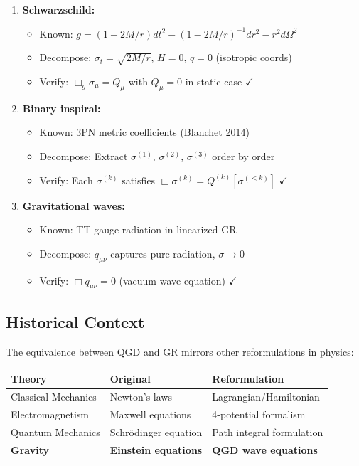 \documentclass[11pt,a4paper]{article}
\theoremstyle{definition}
\theoremstyle{remark}
\begin{document}
	\begin{enumerate}
		\item \textbf{Schwarzschild:}
		\begin{itemize}
			\item Known: $g = (1-2M/r)dt^2 - (1-2M/r)^{-1}dr^2 - r^2d\Omega^2$
			\item Decompose: $\sigma_t = \sqrt{2M/r}$, $H=0$, $q=0$ (isotropic coords)
			\item Verify: $\Box_g\sigma_\mu = Q_\mu$ with $Q_\mu = 0$ in static case $\checkmark$
		\end{itemize}
		
		\item \textbf{Binary inspiral:}
		\begin{itemize}
			\item Known: 3PN metric coefficients (Blanchet 2014)
			\item Decompose: Extract $\sigma^{(1)}$, $\sigma^{(2)}$, $\sigma^{(3)}$ order by order
			\item Verify: Each $\sigma^{(k)}$ satisfies $\Box\sigma^{(k)} = Q^{(k)}[\sigma^{(<k)}]$ $\checkmark$
		\end{itemize}
		
		\item \textbf{Gravitational waves:}
		\begin{itemize}
			\item Known: TT gauge radiation in linearized GR
			\item Decompose: $q_{\mu\nu}$ captures pure radiation, $\sigma \to 0$
			\item Verify: $\Box q_{\mu\nu} = 0$ (vacuum wave equation) $\checkmark$
		\end{itemize}
	\end{enumerate}
	
	\subsection{Historical Context}
	
	The equivalence between QGD and GR mirrors other reformulations in physics:
	
	\begin{center}
		\begin{tabular}{lll}
			\toprule
			\textbf{Theory} & \textbf{Original} & \textbf{Reformulation}\\
			\midrule
			Classical Mechanics & Newton's laws & Lagrangian/Hamiltonian\\
			Electromagnetism & Maxwell equations & 4-potential formalism\\
			Quantum Mechanics & Schrödinger equation & Path integral formulation\\
			\textbf{Gravity} & \textbf{Einstein equations} & \textbf{QGD wave equations}\\
			\bottomrule
		\end{tabular}
	\end{center}
	
\end{document}
